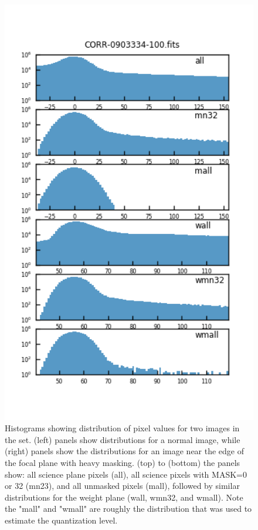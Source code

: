 \begin{figure}
\begin{minipage}{.475\textwidth}
  \end{minipage}
  \begin{minipage}{.475\textwidth}
    \centering
    \includegraphics[width=1.0\textwidth]{figure/imgdist_CORR-0903334-100.fits.png}
  \end{minipage}
\caption{Histograms showing distribution of pixel values for two images in the set. (left) panels show 
distributions for a normal image, while (right) panels show the distributions for an image near the edge 
of the focal plane with heavy masking.  (top) to (bottom) the panels show: all science plane pixels (all), 
all science pixels with MASK=0 or 32 (mn23), and all unmasked pixels (mall), followed by similar
distributions for the weight plane (wall, wmn32, and wmall).  Note the "mall" and "wmall" are roughly
the distribution that was used to estimate the quantization level.}
\label{pixel_dist}
\end{figure}

